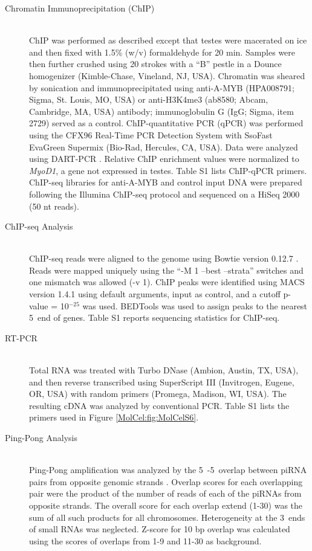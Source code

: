 \begin{description}
    \item[Chromatin Immunoprecipitation (ChIP)] \hfill \\
    ChIP was performed as described \citep{Chen2008} except that testes were macerated on ice and then fixed with 1.5\% (w/v) formaldehyde for 20 min. Samples were then further crushed using 20 strokes with a ``B'' pestle in a Dounce homogenizer (Kimble-Chase, Vineland, NJ, USA). Chromatin was sheared by sonication and immunoprecipitated using anti-A-MYB (HPA008791; Sigma, St. Louis, MO, USA) or anti-H3K4me3 (ab8580; Abcam, Cambridge, MA, USA) antibody; immunoglobulin G (IgG; Sigma, item 2729) served as a control. ChIP-quantitative PCR (qPCR) was performed using the CFX96 Real-Time PCR Detection System with SsoFast EvaGreen Supermix (Bio-Rad, Hercules, CA, USA). Data were analyzed using DART-PCR \citep{Peirson2003}. Relative ChIP enrichment values were normalized to \textit{MyoD1}, a gene not expressed in testes. Table S1 lists ChIP-qPCR primers. ChIP-seq libraries for anti-A-MYB and control input DNA were prepared following the Illumina ChIP-seq protocol and sequenced on a HiSeq 2000 (50 nt reads).

    \item[ChIP-seq Analysis] \hfill \\
    ChIP-seq reads were aligned to the genome using Bowtie version 0.12.7 \citep{Langmead2009}. Reads were mapped uniquely using the ``-M 1 --best --strata'' switches and one mismatch was allowed (-v 1). ChIP peaks were identified using MACS version 1.4.1 \citep{Zhang2008} using default arguments, input as control, and a cutoff p-value = 10$^{-25}$ was used. BEDTools was used to assign peaks to the nearest 5\textprime~end of genes. Table S1 reports sequencing statistics for ChIP-seq.

    \item[RT-PCR] \hfill \\
    Total RNA was treated with Turbo DNase (Ambion, Austin, TX, USA), and then reverse transcribed using SuperScript III (Invitrogen, Eugene, OR, USA) with random primers (Promega, Madison, WI, USA). The resulting cDNA was analyzed by conventional PCR. Table S1 lists the primers used in Figure \ref{MolCel:fig:MolCelS6}.

    \item[Ping-Pong Analysis] \hfill \\
    Ping-Pong amplification was analyzed by the 5\textprime~-5\textprime~overlap between piRNA pairs from opposite genomic strands \citep{Li2009a}. Overlap scores for each overlapping pair were the product of the number of reads of each of the piRNAs from opposite strands. The overall score for each overlap extend (1-30) was the sum of all such products for all chromosomes. Heterogeneity at the 3\textprime~ends of small RNAs was neglected. Z-score for 10 bp overlap was calculated using the scores of overlaps from 1-9 and 11-30 as background.


\end{description}
